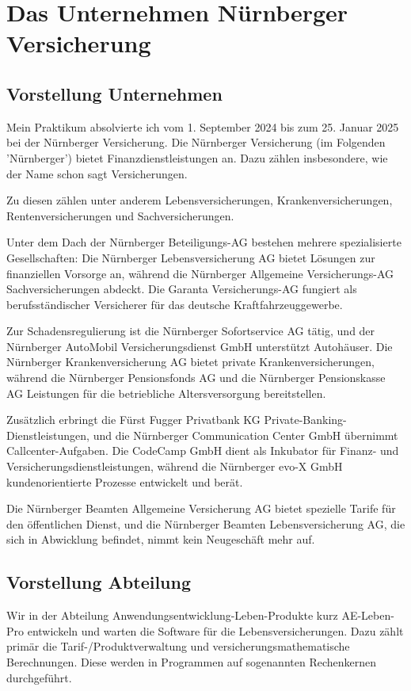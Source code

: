 \chapter{Das Unternehmen Nürnberger Versicherung}
\section{Vorstellung Unternehmen}
Mein Praktikum absolvierte ich vom 1. September 2024 bis zum 25. Januar 2025 bei der Nürnberger Versicherung.
Die Nürnberger Versicherung (im Folgenden 'Nürnberger') bietet Finanzdienstleistungen an.
Dazu zählen insbesondere, wie der Name schon sagt Versicherungen.

Zu diesen zählen unter anderem Lebensversicherungen, Krankenversicherungen, Rentenversicherungen und Sachversicherungen.

Unter dem Dach der Nürnberger Beteiligungs-AG bestehen mehrere spezialisierte Gesellschaften: Die Nürnberger Lebensversicherung AG bietet Lösungen zur finanziellen Vorsorge an, während die Nürnberger Allgemeine Versicherungs-AG Sachversicherungen abdeckt. Die Garanta Versicherungs-AG fungiert als berufsständischer Versicherer für das deutsche Kraftfahrzeuggewerbe.

Zur Schadensregulierung ist die Nürnberger Sofortservice AG tätig, und der Nürnberger AutoMobil Versicherungsdienst GmbH unterstützt Autohäuser. Die Nürnberger Krankenversicherung AG bietet private Krankenversicherungen, während die Nürnberger Pensionsfonds AG und die Nürnberger Pensionskasse AG Leistungen für die betriebliche Altersversorgung bereitstellen.

Zusätzlich erbringt die Fürst Fugger Privatbank KG Private-Banking-Dienst\-leistungen, und die Nürnberger Communication Center GmbH übernimmt Call\-center-Aufgaben. 
Die CodeCamp GmbH dient als Inkubator für Finanz- und Versicherungsdienstleistungen, während die Nürnberger evo-X GmbH kundenorientierte Prozesse entwickelt und berät.

Die Nürnberger Beamten Allgemeine Versicherung AG bietet spezielle Tarife für den öffentlichen Dienst, und die Nürnberger Beamten Lebensversicherung AG, die sich in Abwicklung befindet, nimmt kein Neugeschäft mehr auf.\cite{NürnbergerWiki2024}
\section{Vorstellung Abteilung}
Wir in der Abteilung Anwendungsentwicklung-Leben-Produkte kurz AE-Leben-Pro entwickeln und warten die Software für die Lebensversicherungen.
Dazu zählt primär die Tarif-/Produktverwaltung und versicherungsmathematische Berechnungen. 
Diese werden in Programmen auf sogenannten Rechenkernen durchgeführt.

